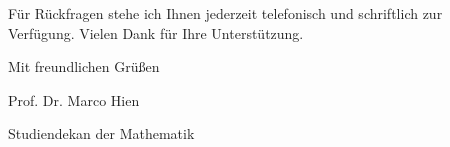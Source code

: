 \documentclass{serienbrief}
\newif\ifmore \moretrue
\begin{document}
F\"ur R\"uckfragen stehe ich Ihnen jederzeit telefonisch und schriftlich zur Verf\"ugung. Vielen Dank f\"ur Ihre Unterst\"utzung.

Mit freundlichen Gr\"u\ss en

\vspace{1cm}

Prof. Dr. Marco Hien

\vspace{-0.2cm}

{\small Studiendekan der Mathematik}

\newpage

 \fi
 \ifmore\repeat
 
 \closein\quelle
\end{document}
